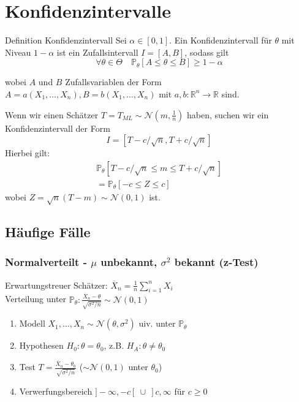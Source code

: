 \documentclass[a4paper,10pt]{article}
\def\R{\mathbb{R}}
\def\P{\mathbb{P}}
\begin{document}
\section{Konfidenzintervalle}
\begin{mainbox}{Definition Konfidenzintervall}
	Sei \(\alpha \in [0,1]\). Ein Konfidenzintervall für \(\theta\) mit Niveau \(1 - \alpha\) ist ein Zufallsintervall \(I=[A,B]\), sodass gilt
	\[\forall \theta \in \Theta \quad \P_\theta[A\le \theta \le B] \ge 1- \alpha\]

	wobei \(A\) und \(B\) Zufallsvariablen der Form \(A = a(X_1, \ldots, X_n), B = b(X_1, \ldots, X_n)\) mit \(a,b: \R^n \to \R\) sind.
\end{mainbox}

Wenn wir einen Schätzer \(T = T_{ML} \sim \mathcal{N}(m, \frac{1}{n})\) haben, suchen wir ein Konfidenzintervall der Form
\[I = [T-c/\sqrt{n}, T+c/\sqrt{n}]\]
Hierbei gilt:
\begin{align*}
	\P_\theta[T-c/\sqrt{n} \le m \le T+c/\sqrt{n}] \\
	= \P_\theta[-c\le Z \le c]
\end{align*}
wobei \(Z = \sqrt{n}(T-m) \sim \mathcal{N}(0, 1)\) ist.

\subsection{Häufige Fälle}
\subsubsection*{\texorpdfstring{Normalverteilt - \(\mu\) unbekannt, \(\sigma^2\) bekannt (z-Test)}{Normalverteilt - μ unbekannt, σ² bekannt (z-Test)}}
Erwartungstreuer Schätzer: \(\overline{X}_n = \frac{1}{n} \sum_{i=1}^n X_i\)\\
Verteilung unter \(\P_\theta: \frac{\overline{X}_n - \theta}{\sqrt{\sigma^2/n}} \sim \mathcal{N}(0,1)\)
\begin{enumerate}
	\item Modell \(X_1, \ldots, X_n \sim \mathcal{N}(\theta, \sigma^2)\) uiv. unter \(\P_\theta\)
	\item Hypothesen \(H_0 : \theta = \theta_0\), z.B. \(H_A : \theta \ne \theta_0\)
	\item Test \(T = \frac{\overline{X}_n - \theta_0}{\sqrt{\sigma^2/n}} \) ($\sim \mathcal{N}(0,1)$ unter $\theta_0$)
	\item Verwerfungsbereich \(]-\infty, -c[ \ \cup \ ] c, \infty\) für \(c\ge 0\)
\end{enumerate}
\end{document}
